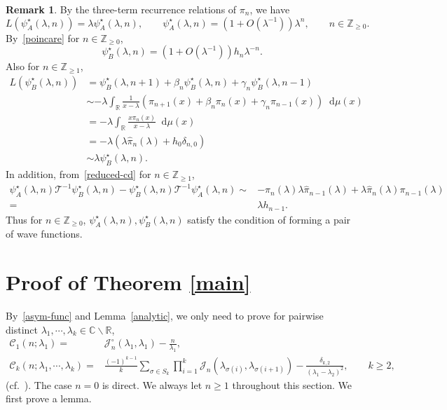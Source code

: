 \documentclass[a4paper]{article}
\theoremstyle{plain}
\theoremstyle{definition}
\newtheorem{remark}{Remark}
\newcommand{\dif}{\mathop{}\!\mathrm{d}}
\newcommand{\ZZ}{\mathbb{Z}}
\newcommand{\RR}{\mathbb{R}}
\newcommand{\CC}{\mathbb{C}}
\newcommand{\nn}{\nonumber}
\begin{document}
	\begin{remark}
		By the three-term recurrence relations of $\pi_n$, we have
\begin{equation}
	L(\psi_A^\star(\lambda,n))=\lambda\psi_A^\star(\lambda,n),\qquad\psi_A^\star(\lambda,n)=(1+O(\lambda^{-1}))\lambda^n,\qquad n\in\ZZ_{\ge0}.
\end{equation}
By~\eqref{poincare} for $n\in\ZZ_{\ge0}$,
 \begin{equation}
	\psi_B^\star(\lambda,n)=(1+O(\lambda^{-1}))h_n\lambda^{-n}.
 \end{equation} Also for $n\in\ZZ_{\ge1}$,
 \begin{align}
	L(\psi_B^\star(\lambda,n))&=\psi_B^\star(\lambda,n+1)+\beta_n\psi_B^\star(\lambda,n)+\gamma_n\psi_B^\star(\lambda,n-1)\nn\\
	&\sim-\lambda\int_\RR\frac{1}{x-\lambda}(\pi_{n+1}(x)+\beta_n\pi_n(x)+\gamma_n\pi_{n-1}(x))\dif\mu(x)\nn\\
	&=-\lambda\int_\RR\frac{x\pi_n(x)}{x-\lambda}\dif\mu(x)\nn\\
 	&=-\lambda(\lambda\widehat\pi_n(\lambda)+h_0\delta_{n,0})\nn\\
	&\sim\lambda\psi_B^\star(\lambda,n).
 \end{align} In addition, from~\eqref{reduced-cd} for $n\in\ZZ_{\ge1}$, 
 \begin{align}
	\psi_A^\star(\lambda,n)\mathcal T^{-1}\psi_B^\star(\lambda,n)-\psi_B^\star(\lambda,n)\mathcal T^{-1}\psi_A^\star(\lambda,n)\sim&-\pi_n(\lambda)\lambda\widehat\pi_{n-1}(\lambda)+\lambda\widehat\pi_n(\lambda)\pi_{n-1}(\lambda)\nn\\
 	=&\lambda h_{n-1}. \label{wronskian}
 \end{align} 
 Thus for $n\in\ZZ_{\ge0}$, $\psi_A^\star(\lambda,n),\psi_B^\star(\lambda,n)$ satisfy the condition of forming a pair of wave functions.
	\end{remark}


	

\section{Proof of Theorem \ref{main}} \label{T1sec}

By~\eqref{asym-func} and Lemma~\ref{analytic}, we only need to prove for pairwise distinct $\lambda_1,\cdots,\lambda_k\in\CC\backslash\RR$,
\begin{align}
	\mathcal C_1(n;\lambda_1)=&\mathcal J_n^\circ(\lambda_1,\lambda_1)-\frac{n}{\lambda_1}, \label{mainanaly1}\\
	\mathcal C_k(n;\lambda_1,\cdots,\lambda_k)=&\frac{(-1)^{k-1}}{k}\sum_{\sigma\in S_k}\prod_{i=1}^k\mathcal J_n(\lambda_{\sigma(i)},\lambda_{\sigma(i+1)})-\frac{\delta_{k,2}}{(\lambda_1-\lambda_2)^2},\qquad k\ge2, \label{mainanaly}
\end{align}
(cf.~\cite{BE,DYZcp1,FY,Laguerre,JUE,corJUE}). The case $n=0$ is direct. We always let $n\ge1$ throughout this section. We first prove a lemma.
\end{document}
